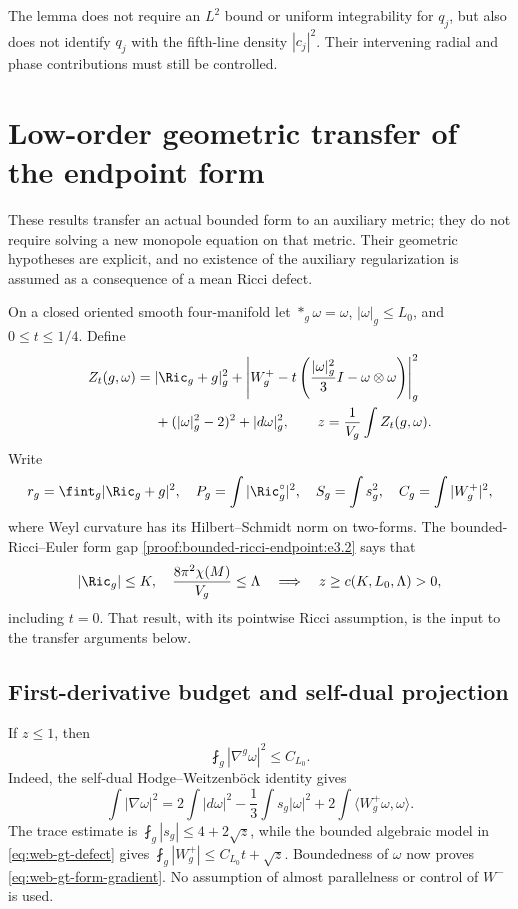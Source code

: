 The lemma does not require an \(L^2\) bound or uniform integrability for
\(q_j\), but also does not identify \(q_j\) with the fifth-line density
\(|c_j|^2\).  Their intervening radial and phase contributions must still
be controlled.

\section{Low-order geometric transfer of the endpoint form}
\label{sec:web-geometric-transfer}

These results transfer an actual bounded form to an auxiliary metric; they
do not require solving a new monopole equation on that metric.  Their
geometric hypotheses are explicit, and no existence of the auxiliary
regularization is assumed as a consequence of a mean Ricci defect.

On a closed oriented smooth four-manifold let \(*_g\omega=\omega\),
\(|\omega|_g\le L_0\), and \(0\le t\le1/4\).  Define
\begin{equation}
 \begin{split}
 Z_t(g,\omega)={}&|\Ric_g+g|_g^2+
 \left|W_g^+-t\left(\frac{|\omega|_g^2}{3}I-\omega\otimes\omega\right)\right|_g^2\\
 &+(|\omega|_g^2-2)^2+|d\omega|_g^2,
 \qquad z=\frac1{V_g}\int Z_t(g,\omega).
 \end{split}
 \label{eq:web-gt-defect}
\end{equation}
Write
\[
 r_g=\fint_g|\Ric_g+g|^2,\quad
 P_g=\int|\Ric_g^\circ|^2,\quad
 S_g=\int s_g^2,\quad C_g=\int|W_g^+|^2,
\]
where Weyl curvature has its Hilbert--Schmidt norm on two-forms.
The bounded-Ricci--Euler form gap
\eqref{proof:bounded-ricci-endpoint:e3.2} says that
\[
 |\Ric_g|\le K,\quad \frac{8\pi^2\chi(M)}{V_g}\le\Lambda
 \quad\Longrightarrow\quad z\ge c(K,L_0,\Lambda)>0,
\]
including \(t=0\).  That result, with its pointwise Ricci assumption,
is the input to the transfer arguments below.

\subsection{First-derivative budget and self-dual projection}

If \(z\le1\), then
\begin{equation}
 \fint_g|\nabla^g\omega|^2\le C_{L_0}.
 \label{eq:web-gt-form-gradient}
\end{equation}
Indeed, the self-dual Hodge--Weitzenb\"ock identity gives
\[
 \int|\nabla\omega|^2
 =2\int|d\omega|^2-\frac13\int s_g|\omega|^2
                  +2\int\langle W_g^+\omega,\omega\rangle.
\]
The trace estimate is \(\fint_g|s_g|\le4+2\sqrt z\), while the
bounded algebraic model in \eqref{eq:web-gt-defect} gives
\(\fint_g|W_g^+|\le C_{L_0}t+\sqrt z\).  Boundedness of \(\omega\)
now proves \eqref{eq:web-gt-form-gradient}.  No assumption of almost
parallelness or control of \(W^-\) is used.

